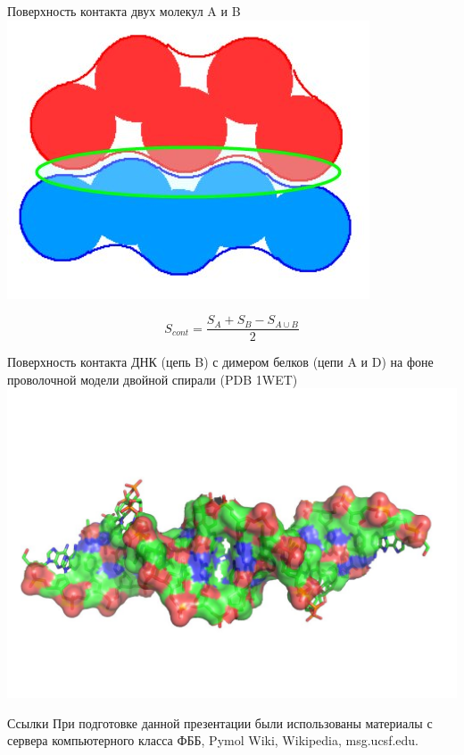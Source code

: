 \documentclass{beamer}
\begin{document}
    \begin{frame}{Поверхность контакта двух молекул A и B}
        \includegraphics[height=0.4\textheight]{contact.jpg}

        $$ S_{cont} = \frac{S_A + S_B - S_{A \cup B}}{2} $$
    \end{frame}

    \begin{frame}{Поверхность контакта ДНК (цепь B)
        с димером белков (цепи A и D)
        на фоне проволочной модели двойной спирали (PDB 1WET)}
        \includegraphics[height=0.8\textheight]{contact-dna.jpg}
    \end{frame}

    \begin{frame}{Ссылки}
        При подготовке данной презентации были использованы материалы с
        сервера компьютерного класса ФББ, Pymol Wiki, Wikipedia, msg.ucsf.edu.
    \end{frame}
\end{document}
